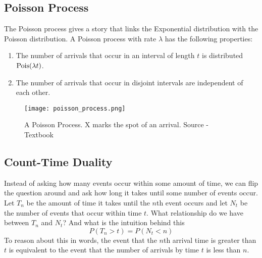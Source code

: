 \documentclass[11.5pt]{article}
\begin{document}
\begin{notes}
\begin{comment}
\shortstack{Uniform \\ \Unif($a, b$)} & \shortstack{$ f(x) = \frac{1}{b-a}, x \in [a, b] $ \\$ f(x) = 0, x \notin [a, b]$} & $\frac{a+b}{2}$ & $\frac{(b-a)^2}{12}$ & $F_X(X)$ ~ & $\frac{e^{tb}-e^{ta}}{t(b-a)}$\\
\hline
\shortstack{Normal \\ $\N(\mu, \sigma^2)$} & $f(x) = \frac{1}{\sigma \sqrt{2\pi}} e^{-\frac{(x - \mu)^2}{2 \sigma^2}}$ & $\mu$  & $\sigma^2$ & ~ & $e^{t\mu + \frac{\sigma^2t^2}{2}}$\\
\hline
\shortstack{Exponential \\ $\Expo(\lambda)$} & \shortstack{$f(x) = \lambda e^{-\lambda y}, x \in [0, \infty)$\\$ f(x) = 0, x \notin [0, \infty)$} & $\sfrac{1}{\lambda}$  & $\sfrac{1}{\lambda^2}$ & ~ & $\frac{\lambda}{\lambda - t}$\\
\hline

\end{tabular}
\end{center}
\end{comment}

\section*{Poisson Process}
The Poisson process gives a story that links the Exponential distribution with the Poisson distribution. A Poisson process with rate $\lambda$ has the following properties:
\begin{enumerate}[label=(\arabic*)]
\item The number of arrivals that occur in an interval of length $t$ is distributed $\textrm{Pois}(\lambda t)$.
\item The number of arrivals that occur in disjoint intervals are independent of each other.
\end{enumerate}
\begin{figure}[h!]\begin{center}
  \texttt{[image: poisson\_process.png]}
  \caption{A Poisson Process. X marks the spot of an arrival. Source - Textbook}
\end{center}\end{figure}

\subsection*{Count-Time Duality}
Instead of asking how many events occur within some amount of time, we can flip the question around and ask how long it takes until some number of events occur. Let $T_n$ be the amount of time it takes until the $n$th event occurs and let $N_t$ be the number of events that occur within time $t$. What relationship do we have between $T_n$ and $N_t$? And what is the intuition behind this 
$$P(T_n > t) = P(N_t < n)$$
To reason about this in words, the event that the $n$th arrival time is greater than $t$ is equivalent to the event that the number of arrivals by time $t$ is less than $n$.


\end{notes}
\end{document}
